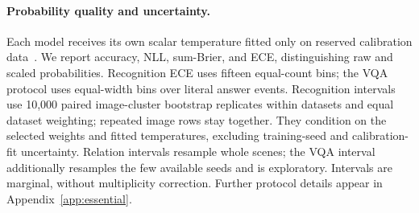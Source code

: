 \paragraph{Probability quality and uncertainty.}
Each model receives its own scalar temperature fitted only on reserved calibration data~\citep{guo_2017_calibration}. We report accuracy, NLL, sum-Brier, and ECE, distinguishing raw and scaled probabilities. Recognition ECE uses fifteen equal-count bins; the VQA protocol uses equal-width bins over literal answer events. Recognition intervals use 10,000 paired image-cluster bootstrap replicates within datasets and equal dataset weighting; repeated image rows stay together. They condition on the selected weights and fitted temperatures, excluding training-seed and calibration-fit uncertainty. Relation intervals resample whole scenes; the VQA interval additionally resamples the few available seeds and is exploratory. Intervals are marginal, without multiplicity correction. Further protocol details appear in Appendix~\ref{app:essential}.
